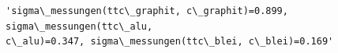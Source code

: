             \begin{tcolorbox}[breakable, size=fbox, boxrule=.5pt, pad at break*=1mm, opacityfill=0]
\begin{Verbatim}[commandchars=\\\{\}]
'sigma\_messungen(ttc\_graphit, c\_graphit)=0.899, sigma\_messungen(ttc\_alu,
c\_alu)=0.347, sigma\_messungen(ttc\_blei, c\_blei)=0.169'
\end{Verbatim}
\end{tcolorbox}
        
    \begin{tcolorbox}[breakable, size=fbox, boxrule=1pt, pad at break*=1mm,colback=cellbackground, colframe=cellborder]
\begin{Verbatim}[commandchars=\\\{\}]

\end{Verbatim}
\end{tcolorbox}

